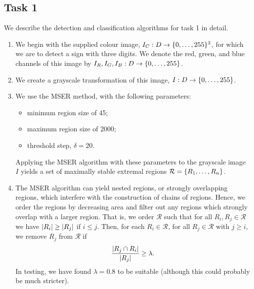 \documentclass{article}
\begin{document}
\subsection{Task 1}
\label{sec:imp-1}

We describe the detection and classification algorithms for task 1 in detail.
\begin{enumerate}
\item
  We begin with the supplied colour image,
  $I_{C} : D \to \lbrace0, \dotsc, 255\rbrace^{3}$, for which we are to detect a sign
  with three digits.
  We denote the red, green, and blue channels of this image by
  $I_{R}, I_{G}, I_{B} : D \to \lbrace0, \dotsc, 255\rbrace$.

\item
  We create a grayscale transformation of this image,
  $I : D \to \lbrace0, \dotsc, 255\rbrace$.

\item
  We use the MSER method, with the following parameters:
  \begin{itemize}
  \item
    minimum region size of 45;
  \item
    maximum region size of 2000;
  \item
    threshold step, $\delta = 20$.
  \end{itemize}
  Applying the MSER algorithm with these parameters to the grayscale image $I$
  yields a set of maximally stable extremal regions
  $\mathcal{R} = \lbrace R_{1}, \dotsc, R_{n}\rbrace$.

\item
  The MSER algorithm can yield nested regions, or strongly overlapping regions,
  which interfere with the construction of chains of regions.
  Hence, we order the regions by decreasing area and filter out any regions
  which strongly overlap with a larger region.
  That is, we order $\mathcal{R}$ such that for all
  $R_{i}, R_{j} \in \mathcal{R}$ we have $\lvert R_{i}\rvert \geq \lvert R_{j}\rvert$ if
  $i \leq j$.
  Then, for each $R_{i} \in \mathcal{R}$, for all $R_{j} \in \mathcal{R}$ with
  $j \geq i$, we remove $R_{j}$ from $\mathcal{R}$ if
  \begin{equation*}
    \frac
    {
      \lvert
        R_{j}
        \cap
        R_{i}
      \rvert
    }
    {
      \lvert
        R_{j}
      \rvert
    }
    \geq
    \lambda
    .
  \end{equation*}
  In testing, we have found $\lambda = 0.8$ to be suitable (although this could
  probably be much stricter).


\end{enumerate}
\end{document}
